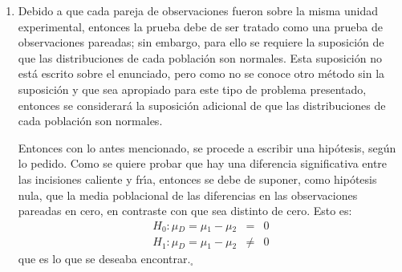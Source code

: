 \begin{solucion}
 $\phantom{0}$
 \begin{enumerate}
  \item Debido a que cada pareja de observaciones fueron sobre la misma unidad
  experimental, entonces la prueba debe de ser tratado como una prueba
  de observaciones pareadas; sin embargo, para ello se requiere la suposici\'on
  de que las distribuciones de cada poblaci\'on son normales.
  Esta suposici\'on no est\'a escrito sobre el enunciado,
  pero como no se conoce otro m\'etodo sin la suposici\'on y que sea apropiado
  para este tipo de problema presentado,
  entonces se considerar\'a la suposici\'on adicional de que las distribuciones de cada poblaci\'on son normales.
  \par 
  Entonces con lo antes mencionado, se procede a escribir una hip\'otesis,
  seg\'un lo pedido. Como se quiere probar que hay una diferencia significativa
  entre las incisiones caliente y fr\'{\i}a, entonces se debe de suponer,
  como hip\'otesis nula, que la media poblacional de las diferencias
  en las observaciones pareadas en cero, en contraste con que sea distinto de cero.
  Esto es:
  \begin{eqnarray*}
   H_0: \mu{}_D = \mu{}_1 - \mu{}_2 &   =  & 0 \\
   H_1: \mu{}_D = \mu{}_1 - \mu{}_2 & \neq & 0
  \end{eqnarray*}
  que es lo que se deseaba encontrar.${}_{\square}$
  

\end{enumerate}
\end{solucion}
